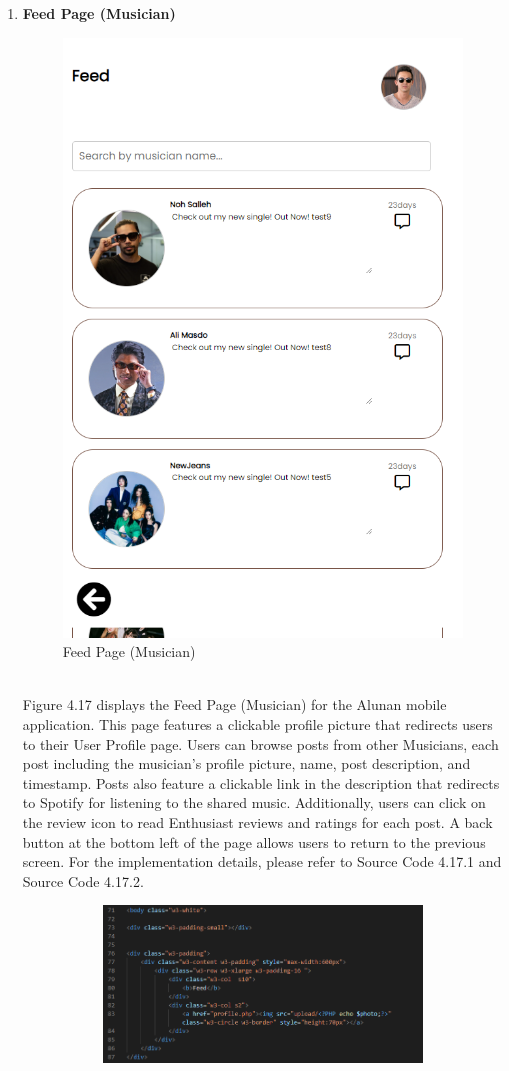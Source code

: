 \begin{enumerate}[1.]
    \item \textbf{Feed Page (Musician)}
    \begin{figure}[h]
        \centering
        \includegraphics[width=0.5\linewidth]{mainmatter/images/frontend/ss/Feed (Musician).png}
        \caption{Feed Page (Musician)}
        \label{fig:myfig56}
    \end{figure} \\
    Figure 4.17 displays the Feed Page (Musician) for the Alunan mobile application. This page features a clickable profile picture that redirects users to their User Profile page. Users can browse posts from other Musicians, each post including the musician's profile picture, name, post description, and timestamp. Posts also feature a clickable link in the description that redirects to Spotify for listening to the shared music. Additionally, users can click on the review icon to read Enthusiast reviews and ratings for each post. A back button at the bottom left of the page allows users to return to the previous screen. For the implementation details, please refer to Source Code 4.17.1 and Source Code 4.17.2.
    \clearpage
    \begin{figure}[h]\ContinuedFloat
        \centering
        \begin{subfigure}[b]{0.8\textwidth}
            \centering
            \includegraphics[width=\textwidth]{mainmatter/images/frontend/code/musicfeed.png}

\end{subfigure}
\end{figure}
\end{enumerate}
